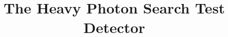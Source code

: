 \documentclass[final,3p,times,twocolumn]{elsarticle}
\begin{document}
\begin{frontmatter}



\title{The Heavy Photon Search Test Detector}












\end{frontmatter}
\end{document}
